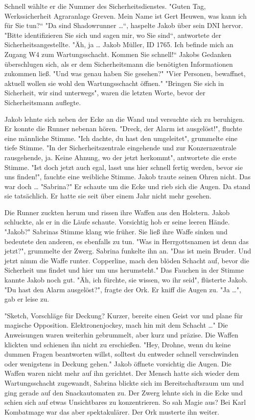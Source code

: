 \documentclass[a4paper, 10pt, twocolumn, twoside]{book}
\begin{document}
Schnell wählte er die Nummer des Sicherheitsdienstes.
"Guten Tag, Werkssicherheit Agraranlage Greven. Mein Name ist Gert Heuwen, was kann ich für Sie tun?“
"Da sind Shadowrunner …“, haspelte Jakob über sein DNI hervor.
"Bitte identifizieren Sie sich und sagen mir, wo Sie sind“, antwortete der Sicherheitsangestellte.
"Äh, ja … Jakob Müller, ID 1765. Ich befinde mich an Zugang W4 zum Wartungsschacht. Kommen Sie schnell!“ Jakobs Gedanken überschlugen sich, als er dem Sicherheitsmann die benötigten Informationen zukommen ließ.
"Und was genau haben Sie gesehen?"
"Vier Personen, bewaffnet, aktuell wollen sie wohl den Wartungsschacht öffnen."
"Bringen Sie sich in Sicherheit, wir sind unterwegs", waren die letzten Worte, bevor der Sicherheitsmann auflegte.

Jakob lehnte sich neben der Ecke an die Wand und versuchte sich zu beruhigen. Er konnte die Runner nebenan hören.
"Dreck, der Alarm ist ausgelöst!", fluchte eine männliche Stimme.
"Ich dachte, du hast den umgeleitet", grummelte eine tiefe Stimme.
"In der Sicherheitszentrale eingehende und zur Konzernzentrale rausgehende, ja. Keine Ahnung, wo der jetzt herkommt", antwortete die erste Stimme.
"Ist doch jetzt auch egal, lasst uns hier schnell fertig werden, bevor sie uns finden!", fauchte eine weibliche Stimme.
Jakob traute seinen Ohren nicht. Das war doch …
"Sabrina?" Er schaute um die Ecke und rieb sich die Augen.
Da stand sie tatsächlich. Er hatte sie seit über einem Jahr nicht mehr gesehen.

Die Runner zuckten herum und rissen ihre Waffen aus den Holstern. Jakob schluckte, als er in die Läufe schaute. Vorsichtig hob er seine leeren Hände.
"Jakob?" Sabrinas Stimme klang wie früher. Sie ließ ihre Waffe sinken und bedeutete den anderen, es ebenfalls zu tun.
"Was in Herrgottsnamen ist denn das jetzt?", grummelte der Zwerg.
Sabrina funkelte ihn an. "Das ist mein Bruder. Und jetzt nimm die Waffe runter. Copperline, mach den blöden Schacht auf, bevor die Sicherheit uns findet und hier um uns herumsteht." Das Fauchen in der Stimme kannte Jakob noch gut.
"Äh, ich fürchte, sie wissen, wo ihr seid", flüsterte Jakob.
"Du hast den Alarm ausgelöst?", fragte der Ork.
Er kniff die Augen zu. "Ja …", gab er leise zu.

"Sketch, Vorschläge für Deckung? Kurzer, bereite einen Geist vor und plane für magische Opposition. Elektronenjockey, mach hin mit dem Schacht …"
Die Anweisungen waren weiterhin gebrummelt, aber kurz und präzise. Die Waffen klickten und schienen ihn nicht zu erschießen.
"Hey, Drohne, wenn du keine dummen Fragen beantworten willst, solltest du entweder schnell verschwinden oder wenigstens in Deckung gehen."
Jakob öffnete vorsichtig die Augen. Die Waffen waren nicht mehr auf ihn gerichtet. Der Mensch hatte sich wieder dem Wartungsschacht zugewandt, Sabrina blickte sich im Bereitschaftsraum um und ging gerade auf den Snackautomaten zu.
Der Zwerg lehnte sich in die Ecke und schien sich auf etwas Unsichtbares zu konzentrieren. So sah Magie aus? Bei Karl Kombatmage war das aber spektakulärer. Der Ork musterte ihn weiter.
\end{document}
